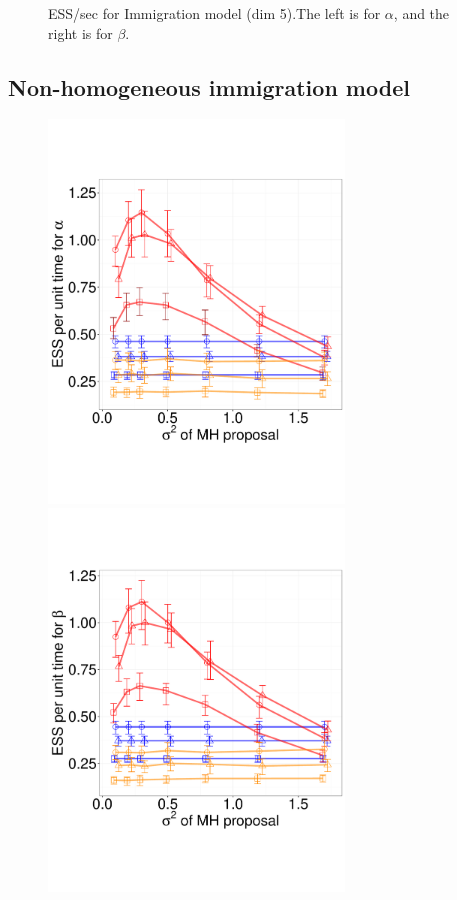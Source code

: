 \begin{figure}
\begin{minipage}[hp]{0.45\linewidth}
    \vspace{-0 in}
      \label{fig:ESS_Q_D5}
  \end{minipage}
    \caption{ESS/sec for Immigration model (dim 5).The left is for $\alpha$, and the right is for $\beta$.}
  \end{figure}

\subsection{Non-homogeneous immigration model}

  \begin{figure}%
  \centering
  \begin{minipage}[!hp]{0.45\linewidth}
  \centering
    \includegraphics [width=0.70\textwidth, angle=0]{figs/pc_5_alpha.pdf}
      \end{minipage}
  \begin{minipage}[!hp]{0.45\linewidth}
  \centering
    \includegraphics [width=0.70\textwidth, angle=0]{figs/pc_5_beta.pdf}

\end{minipage}
\end{figure}
